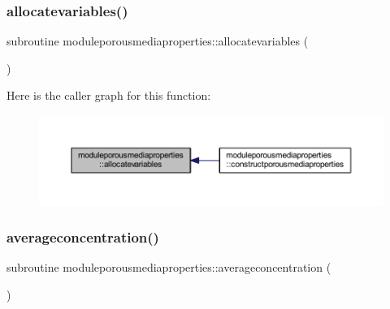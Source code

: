 \subsubsection{\texorpdfstring{allocatevariables()}{allocatevariables()}}
{\footnotesize\ttfamily subroutine moduleporousmediaproperties\+::allocatevariables (\begin{DoxyParamCaption}{ }\end{DoxyParamCaption})\hspace{0.3cm}{\ttfamily [private]}}

Here is the caller graph for this function\+:\nopagebreak
\begin{figure}[H]
\begin{center}
\leavevmode
\includegraphics[width=350pt]{namespacemoduleporousmediaproperties_a266292445f08da6a7567576e04444458_icgraph}
\end{center}
\end{figure}
\mbox{\label{namespacemoduleporousmediaproperties_aa717037551efabb3abaec9e2f610d0f3}} 
\subsubsection{\texorpdfstring{averageconcentration()}{averageconcentration()}}
{\footnotesize\ttfamily subroutine moduleporousmediaproperties\+::averageconcentration (\begin{DoxyParamCaption}{ }\end{DoxyParamCaption})\hspace{0.3cm}{\ttfamily [private]}}

